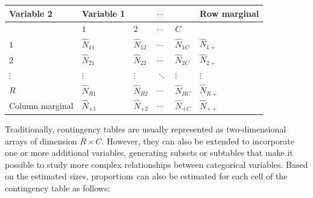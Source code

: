 \documentclass[
  english,
  12pt,
]{book}
\begin{document}
\begin{longtable}[]{@{}
  >{\raggedright\arraybackslash}p{}
  >{\raggedright\arraybackslash}p{}
  >{\raggedright\arraybackslash}p{}
  >{\raggedright\arraybackslash}p{}
  >{\raggedright\arraybackslash}p{}
  >{\raggedright\arraybackslash}p{}@{}}
\toprule\noalign{}
\begin{minipage}[b]{\linewidth}\raggedright
Variable 2
\end{minipage} & \begin{minipage}[b]{\linewidth}\raggedright
Variable 1
\end{minipage} & \begin{minipage}[b]{\linewidth}\raggedright
\end{minipage} & \begin{minipage}[b]{\linewidth}\raggedright
\(\cdots\)
\end{minipage} & \begin{minipage}[b]{\linewidth}\raggedright
\end{minipage} & \begin{minipage}[b]{\linewidth}\raggedright
Row marginal
\end{minipage} \\
\midrule\noalign{}
\endhead
\bottomrule\noalign{}
\endlastfoot
& \(1\) & \(2\) & \(\cdots\) & \(C\) & \\
\(1\) & \(\hat{N}_{11}\) & \(\hat{N}_{12}\) & \(\cdots\) & \(\hat{N}_{1C}\) & \(\hat{N}_{1+}\) \\
\(2\) & \(\hat{N}_{21}\) & \(\hat{N}_{22}\) & \(\cdots\) & \(\hat{N}_{2C}\) & \(\hat{N}_{2+}\) \\
\(\vdots\) & \(\vdots\) & \(\vdots\) & \(\ddots\) & \(\vdots\) & \(\vdots\) \\
\(R\) & \(\hat{N}_{R1}\) & \(\hat{N}_{R2}\) & \(\cdots\) & \(\hat{N}_{RC}\) & \(\hat{N}_{R+}\) \\
Column marginal & \(\hat{N}_{+1}\) & \(\hat{N}_{+2}\) & \(\cdots\) & \(\hat{N}_{+C}\) & \(\hat{N}_{++}\) \\
\end{longtable}

Traditionally, contingency tables are usually represented as two-dimensional arrays of dimension \(R \times C\). However, they can also be extended to incorporate one or more additional variables, generating subsets or subtables that make it possible to study more complex relationships between categorical variables. Based on the estimated sizes, proportions can also be estimated for each cell of the contingency table as follows:
\end{document}
